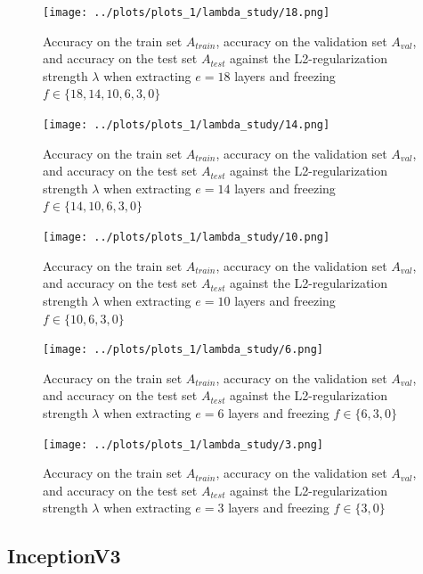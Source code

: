 \begin{figure}[ht]
    \centering
    \texttt{[image: ../plots/plots\_1/lambda\_study/18.png]}
    \caption{Accuracy on the train set $A_{train}$, accuracy on the validation set $A_{val}$, and accuracy on the test set $A_{test}$ against the L2-regularization strength $\lambda$ when extracting $e = 18$ layers and freezing $f \in \{18, 14, 10, 6, 3, 0\}$}
    \label{fig:results_1_18}
\end{figure}

\begin{figure}[ht]
    \centering
    \texttt{[image: ../plots/plots\_1/lambda\_study/14.png]}
    \caption{Accuracy on the train set $A_{train}$, accuracy on the validation set $A_{val}$, and accuracy on the test set $A_{test}$ against the L2-regularization strength $\lambda$ when extracting $e = 14$ layers and freezing $f \in \{14, 10, 6, 3, 0\}$}
    \label{fig:results_1_14}
\end{figure}

\begin{figure}[ht]
    \centering
    \texttt{[image: ../plots/plots\_1/lambda\_study/10.png]}
    \caption{Accuracy on the train set $A_{train}$, accuracy on the validation set $A_{val}$, and accuracy on the test set $A_{test}$ against the L2-regularization strength $\lambda$ when extracting $e = 10$ layers and freezing $f \in \{10, 6, 3, 0\}$}
    \label{fig:results_1_10}
\end{figure}

\begin{figure}[ht]
    \centering
    \texttt{[image: ../plots/plots\_1/lambda\_study/6.png]}
    \caption{Accuracy on the train set $A_{train}$, accuracy on the validation set $A_{val}$, and accuracy on the test set $A_{test}$ against the L2-regularization strength $\lambda$ when extracting $e = 6$ layers and freezing $f \in \{6, 3, 0\}$}
    \label{fig:results_1_6}
\end{figure}

\begin{figure}[ht]
    \centering
    \texttt{[image: ../plots/plots\_1/lambda\_study/3.png]}
    \caption{Accuracy on the train set $A_{train}$, accuracy on the validation set $A_{val}$, and accuracy on the test set $A_{test}$ against the L2-regularization strength $\lambda$ when extracting $e = 3$ layers and freezing $f \in \{3, 0\}$}
    \label{fig:results_1_3}
\end{figure}

\subsection{InceptionV3}

